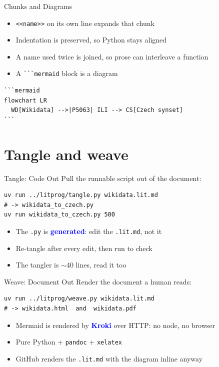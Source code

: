 \documentclass[xetex,aspectratio=169]{beamer}
\newcommand{\txx}[1]{\textbf{\textcolor{blue}{#1}}}
\begin{document}
\begin{frame}[fragile]{Chunks and Diagrams}
  \begin{itemize}
  \item \verb|<<name>>| on its own line expands that chunk
  \item Indentation is preserved, so Python stays aligned
  \item A name used twice is joined, so prose can interleave a function
  \item A \verb|```mermaid| block is a diagram
  \end{itemize}
\begin{verbatim}
```mermaid
flowchart LR
  WD[Wikidata] -->|P5063| ILI --> CS[Czech synset]
```
\end{verbatim}
\end{frame}

\section{Tangle and weave}

\begin{frame}[fragile]{Tangle: Code Out}
  Pull the runnable script out of the document:
\begin{verbatim}
uv run ../litprog/tangle.py wikidata.lit.md
# -> wikidata_to_czech.py
uv run wikidata_to_czech.py 500
\end{verbatim}
  \begin{itemize}
  \item The \texttt{.py} is \txx{generated}: edit the \texttt{.lit.md}, not it
  \item Re-tangle after every edit, then run to check
  \item The tangler is $\sim$40 lines, read it too
  \end{itemize}
\end{frame}

\begin{frame}[fragile]{Weave: Document Out}
  Render the document a human reads:
\begin{verbatim}
uv run ../litprog/weave.py wikidata.lit.md
# -> wikidata.html  and  wikidata.pdf
\end{verbatim}
  \begin{itemize}
  \item Mermaid is rendered by \txx{Kroki} over HTTP: no node, no browser
  \item Pure Python $+$ \texttt{pandoc} $+$ \texttt{xelatex}
  \item GitHub renders the \texttt{.lit.md} with the diagram inline anyway
  \end{itemize}
\end{frame}
\end{document}
